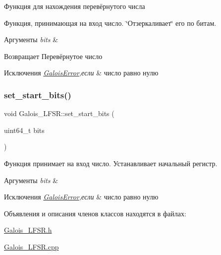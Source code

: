 Функция для нахождения перевёрнутого числа 

Функция, принимающая на вход число. \char`\"{}Отзеркаливает\char`\"{} его по битам.


\begin{DoxyParams}{Аргументы}
{\em bits} & \\
\hline
\end{DoxyParams}
\begin{DoxyReturn}{Возвращает}
Перевёрнутое число 
\end{DoxyReturn}

\begin{DoxyExceptions}{Исключения}
{\em \hyperlink{classGaloisError}{Galois\+Error},если} & число равно нулю \\
\hline
\end{DoxyExceptions}
\mbox{\label{classGalois__LFSR_aa3a893992b929b01a649d859a121ae34}} 
\subsubsection{\texorpdfstring{set\+\_\+start\+\_\+bits()}{set\_start\_bits()}}
{\footnotesize\ttfamily void Galois\+\_\+\+L\+F\+S\+R\+::set\+\_\+start\+\_\+bits (\begin{DoxyParamCaption}\item[{uint64\+\_\+t}]{bits }\end{DoxyParamCaption})}



Функция принимает на вход число. Устанавливает начальный регистр. 


\begin{DoxyParams}{Аргументы}
{\em bits} & \\
\hline
\end{DoxyParams}

\begin{DoxyExceptions}{Исключения}
{\em \hyperlink{classGaloisError}{Galois\+Error},если} & число равно нулю \\
\hline
\end{DoxyExceptions}


Объявления и описания членов классов находятся в файлах\+:\begin{DoxyCompactItemize}
\item 
\hyperlink{Galois__LFSR_8h}{Galois\+\_\+\+L\+F\+S\+R.\+h}\item 
\hyperlink{Galois__LFSR_8cpp}{Galois\+\_\+\+L\+F\+S\+R.\+cpp}\end{DoxyCompactItemize}
